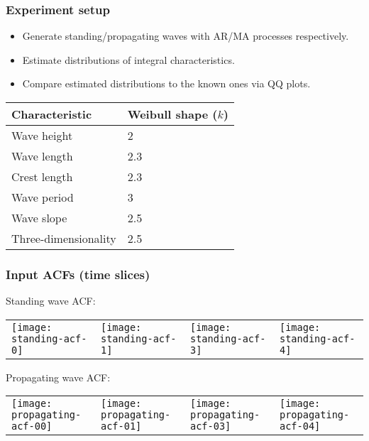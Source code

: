 \documentclass[14pt,aspectratio=169]{beamer}
\begin{document}
	\begin{frame}
		\frametitle{Experiment setup}
		\begin{itemize}
			\item Generate standing/propagating waves with
				  AR/MA processes respectively.
			\item Estimate distributions of integral
				  characteristics.
			\item Compare estimated distributions to the
				  known ones via QQ plots.
		\end{itemize}
		\vfill%
		\begin{center}
			\small
			\begin{tabular}{ll}
				\toprule
				Characteristic & Weibull shape ($k$) \\
				\midrule
				Wave height & 2 \\
				Wave length & 2.3 \\
				Crest length & 2.3 \\
				Wave period & 3 \\
				Wave slope & 2.5 \\
				Three-dimensionality & 2.5 \\
				\bottomrule
			\end{tabular}%
		\end{center}
	\end{frame}

	\begin{frame}
		\frametitle{Input ACFs (time slices)}
		Standing wave ACF:
		\vfill%
		\begin{tabular}{llll}%
			\texttt{[image: standing-acf-0]} &
			\texttt{[image: standing-acf-1]} &
			\texttt{[image: standing-acf-3]} &
			\texttt{[image: standing-acf-4]} \\
		\end{tabular}
		\vfill%
		Propagating wave ACF:
		\vfill%
		\begin{tabular}{llll}%
			\texttt{[image: propagating-acf-00]} &
			\texttt{[image: propagating-acf-01]} &
			\texttt{[image: propagating-acf-03]} &
			\texttt{[image: propagating-acf-04]} \\
		\end{tabular}
	\end{frame}
\end{document}
